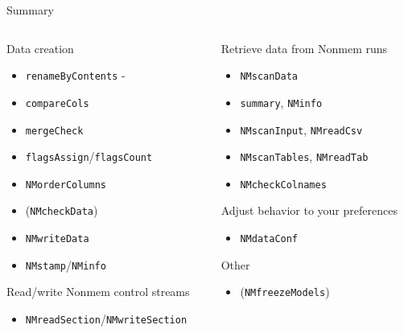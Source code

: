 \documentclass[
  8pt,
  ignorenonframetext,
  aspectratio=169]{beamer}
\providecommand{\tightlist}{%
  \setlength{\itemsep}{0pt}\setlength{\parskip}{0pt}}
\begin{document}
\begin{frame}[fragile]{Summary}
\begin{columns}[T]
\begin{column}{0.48\textwidth}
Data creation

\begin{itemize}
\tightlist
\item
  \texttt{renameByContents} -
\item
  \texttt{compareCols}
\item
  \texttt{mergeCheck}
\item
  \texttt{flagsAssign}/\texttt{flagsCount}
\item
  \texttt{NMorderColumns}
\item
  (\texttt{NMcheckData})
\item
  \texttt{NMwriteData}
\item
  \texttt{NMstamp}/\texttt{NMinfo}
\end{itemize}

Read/write Nonmem control streams

\begin{itemize}
\tightlist
\item
  \texttt{NMreadSection}/\texttt{NMwriteSection}
\end{itemize}
\end{column}

\begin{column}{0.48\textwidth}
Retrieve data from Nonmem runs

\begin{itemize}
\tightlist
\item
  \texttt{NMscanData}
\item
  \texttt{summary}, \texttt{NMinfo}
\item
  \texttt{NMscanInput}, \texttt{NMreadCsv}
\item
  \texttt{NMscanTables}, \texttt{NMreadTab}
\item
  \texttt{NMcheckColnames}
\end{itemize}

Adjust behavior to your preferences

\begin{itemize}
\tightlist
\item
  \texttt{NMdataConf}
\end{itemize}

Other

\begin{itemize}
\tightlist
\item
  (\texttt{NMfreezeModels})
\end{itemize}
\end{column}
\end{columns}
\end{frame}
\end{document}
